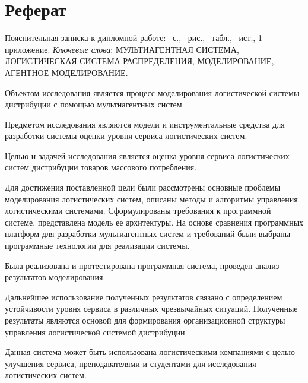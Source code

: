 \section*{Реферат}
Пояснительная записка к дипломной работе: \pageref{LastPage}~с., \totalfigures~рис., \totaltables~табл., ~ист., 1 приложение. \bigbreak
\textit{Ключевые слова}: \MakeUppercase{мультиагентная система, логистическая система распределения, моделирование, агентное моделирование}. \bigbreak

Объектом исследования является процесс моделирования логистической системы дистрибуции с помощью мультиагентных систем.

Предметом исследования являются модели и инструментальные средства для разработки системы оценки уровня сервиса логистических систем.

Целью и задачей исследования является оценка уровня сервиса логистических систем дистрибуции товаров массового потребления.

Для достижения поставленной цели были рассмотрены основные проблемы моделирования логистических систем, описаны методы и алгоритмы управления логистическими системами. Сформулированы требования к программной системе, представлена модель ее архитектуры. На основе сравнения программных платформ для разработки мультиагентных систем и требований были выбраны программные технологии для реализации системы.

Была реализована и протестирована программная система, проведен анализ результатов моделирования.

Дальнейшее использование полученных результатов связано с определением устойчивости уровня сервиса в различных чрезвычайных ситуаций. Полученные результаты являются основой для формирования организационной структуры управления логистической системой дистрибуции.

Данная система может быть использована логистическими компаниями с целью улучшения сервиса, преподавателями и студентами для исследования логистических систем.

